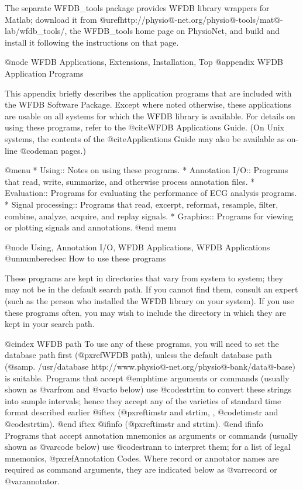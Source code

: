 {{{{{{{{{The separate WFDB_tools package provides WFDB library wrappers for
Matlab;  download it from
@uref{http://physio@-net.org/physio@-tools/mat@-lab/wfdb_tools/}, the
WFDB_tools home page on PhysioNet, and build and install it following the
instructions on that page.

@node     WFDB Applications, Extensions, Installation, Top
@appendix WFDB Application Programs

This appendix briefly describes the application programs that are
included with the WFDB Software Package.  Except where noted otherwise,
these applications are usable on all systems for which the WFDB library is
available.  For details on using these programs, refer to the @cite{WFDB
Applications Guide}.  (On Unix systems, the contents of the
@cite{Applications Guide} may also be available as on-line @code{man}
pages.)

@menu
* Using::		Notes on using these programs.
* Annotation I/O::	Programs that read, write, summarize, and
			otherwise process annotation files.
* Evaluation::		Programs for evaluating the performance of ECG
			analysis programs.
* Signal processing::	Programs that read, excerpt, reformat, resample,
			filter, combine, analyze, acquire, and replay signals.
* Graphics::		Programs for viewing or plotting signals and
			annotations.
@end menu

@node     Using, Annotation I/O, WFDB Applications, WFDB Applications
@unnumberedsec How to use these programs

These programs are kept in directories that vary from system to system;
they may not be in the default search path.  If you cannot find them,
consult an expert (such as the person who installed the WFDB library on
your system).  If you use these programs often, you may wish to include
the directory in which they are kept in your search path.

@cindex WFDB path
To use any of these programs, you will need to set the database path first
(@pxref{WFDB path}), unless the default database path
(@samp{. /usr/database http://www.physio@-net.org/physio@-bank/data@-base})
is suitable. Programs that accept @emph{time} arguments or commands (usually
shown as @var{from} and @var{to} below) use @code{strtim} to convert these
strings into sample intervals; hence they accept any of the varieties of
standard time format described earlier
@iftex
(@pxref{timstr and strtim, , @code{timstr} and @code{strtim}}).
@end iftex
@ifinfo
(@pxref{timstr and strtim}).
@end ifinfo
Programs that accept annotation mnemonics as arguments or commands
(usually shown as @var{code} below) use @code{strann} to interpret them;
for a list of legal mnemonics, @pxref{Annotation Codes}.  Where record
or annotator names are required as command arguments, they are indicated
below as @var{record} or @var{annotator}.

}}}}}}}}}
